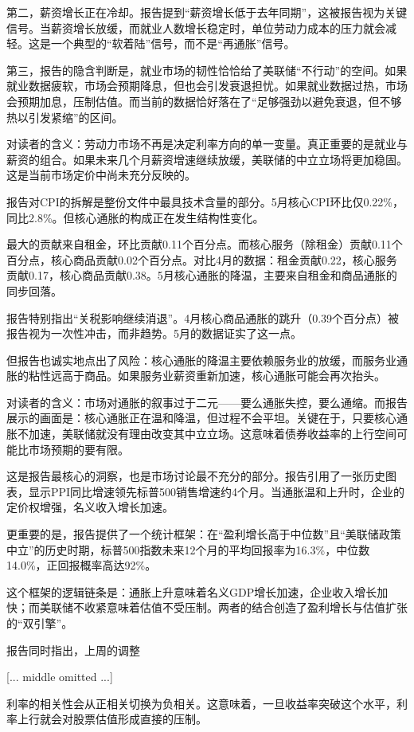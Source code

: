 \documentclass[11pt]{ctexart}
\begin{document}
第二，薪资增长正在冷却。报告提到“薪资增长低于去年同期”，这被报告视为关键信号。当薪资增长放缓，而就业人数增长稳定时，单位劳动力成本的压力就会减轻。这是一个典型的“软着陆”信号，而不是“再通胀”信号。

第三，报告的隐含判断是，就业市场的韧性恰恰给了美联储“不行动”的空间。如果就业数据疲软，市场会预期降息，但也会引发衰退担忧。如果就业数据过热，市场会预期加息，压制估值。而当前的数据恰好落在了“足够强劲以避免衰退，但不够热以引发紧缩”的区间。

对读者的含义：劳动力市场不再是决定利率方向的单一变量。真正重要的是就业与薪资的组合。如果未来几个月薪资增速继续放缓，美联储的中立立场将更加稳固。这是当前市场定价中尚未充分反映的。

报告对CPI的拆解是整份文件中最具技术含量的部分。5月核心CPI环比仅0.22\%，同比2.8\%。但核心通胀的构成正在发生结构性变化。

最大的贡献来自租金，环比贡献0.11个百分点。而核心服务（除租金）贡献0.11个百分点，核心商品贡献0.02个百分点。对比4月的数据：租金贡献0.22，核心服务贡献0.17，核心商品贡献0.38。5月核心通胀的降温，主要来自租金和商品通胀的同步回落。

报告特别指出“关税影响继续消退”。4月核心商品通胀的跳升（0.39个百分点）被报告视为一次性冲击，而非趋势。5月的数据证实了这一点。

但报告也诚实地点出了风险：核心通胀的降温主要依赖服务业的放缓，而服务业通胀的粘性远高于商品。如果服务业薪资重新加速，核心通胀可能会再次抬头。

对读者的含义：市场对通胀的叙事过于二元——要么通胀失控，要么通缩。而报告展示的画面是：核心通胀正在温和降温，但过程不会平坦。关键在于，只要核心通胀不加速，美联储就没有理由改变其中立立场。这意味着债券收益率的上行空间可能比市场预期的要有限。

这是报告最核心的洞察，也是市场讨论最不充分的部分。报告引用了一张历史图表，显示PPI同比增速领先标普500销售增速约4个月。当通胀温和上升时，企业的定价权增强，名义收入增长加速。

更重要的是，报告提供了一个统计框架：在“盈利增长高于中位数”且“美联储政策中立”的历史时期，标普500指数未来12个月的平均回报率为16.3\%，中位数14.0\%，正回报概率高达92\%。

这个框架的逻辑链条是：通胀上升意味着名义GDP增长加速，企业收入增长加快；而美联储不收紧意味着估值不受压制。两者的结合创造了盈利增长与估值扩张的“双引擎”。

报告同时指出，上周的调整

[... middle omitted ...]

利率的相关性会从正相关切换为负相关。这意味着，一旦收益率突破这个水平，利率上行就会对股票估值形成直接的压制。
\end{document}

